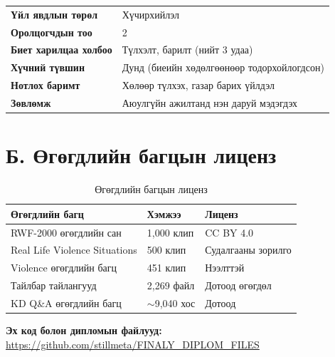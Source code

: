 \vspace{4pt}

\begin{tcolorbox}[tab2, title={Дүгнэлт ба зөвлөмж}]
\small
\begin{tabular}{@{}ll}
\textbf{Үйл явдлын төрөл}        & Хүчирхийлэл \\
\textbf{Оролцогчдын тоо}          & 2 \\
\textbf{Биет харилцаа холбоо}     & Түлхэлт, барилт (нийт 3 удаа) \\
\textbf{Хүчний түвшин}            & Дунд (биеийн хөдөлгөөнөөр тодорхойлогдсон) \\
\textbf{Нотлох баримт}            & Хөлөөр түлхэх, газар барих үйлдэл \\
\textbf{Зөвлөмж}                  & Аюулгүйн ажилтанд нэн даруй мэдэгдэх \\
\end{tabular}
\end{tcolorbox}

\section*{Б. Өгөгдлийн багцын лиценз}

\begin{table}[H]
\centering
\caption{Өгөгдлийн багцын лиценз}
\label{tab:dataset_license}
\small
\begin{tabular*}{0.92\textwidth}{@{\extracolsep{\fill}}lll@{}}
\toprule
\textbf{Өгөгдлийн багц} & \textbf{Хэмжээ} & \textbf{Лиценз} \\
\midrule
RWF-2000 өгөгдлийн сан & 1{,}000 клип & CC BY 4.0 \\
Real Life Violence Situations & 500 клип & Судалгааны зорилго \\
Violence өгөгдлийн багц & 451 клип & Нээлттэй \\
Тайлбар тайлангууд & 2{,}269 файл & Дотоод өгөгдөл \\
KD Q\&A өгөгдлийн багц & $\sim$9{,}040 хос & Дотоод \\
\bottomrule
\end{tabular*}
\normalsize
\end{table}

\noindent\textbf{Эх код болон дипломын файлууд:}
\url{https://github.com/stillmeta/FINALY_DIPLOM_FILES}
